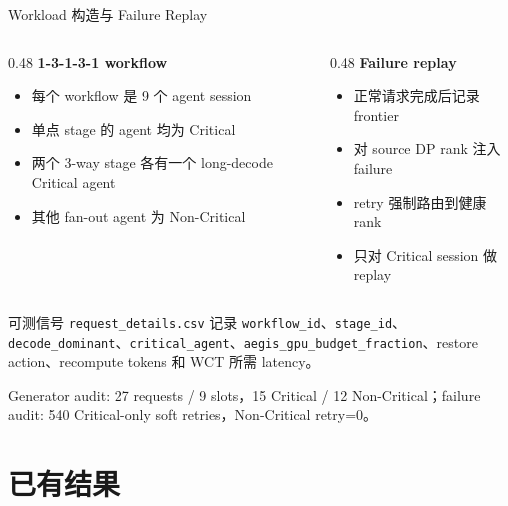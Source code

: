 \documentclass[aspectratio=43]{beamer}
\newcommand{\tightitems}{\setlength{\itemsep}{2pt}\setlength{\parskip}{0pt}}
\begin{document}
\begin{frame}{Workload 构造与 Failure Replay}
  \small
  \begin{columns}[T,onlytextwidth]
    \begin{column}{0.48\textwidth}
      \textbf{1-3-1-3-1 workflow}
      \begin{itemize}
        \tightitems
        \item 每个 workflow 是 9 个 agent session
        \item 单点 stage 的 agent 均为 Critical
        \item 两个 3-way stage 各有一个 long-decode Critical agent
        \item 其他 fan-out agent 为 Non-Critical
      \end{itemize}
    \end{column}
    \begin{column}{0.48\textwidth}
      \textbf{Failure replay}
      \begin{itemize}
        \tightitems
        \item 正常请求完成后记录 frontier
        \item 对 source DP rank 注入 failure
        \item retry 强制路由到健康 rank
        \item 只对 Critical session 做 replay
      \end{itemize}
    \end{column}
  \end{columns}

  \vspace{0.2cm}
  \begin{block}{可测信号}
    \footnotesize
    \texttt{request\_details.csv} 记录 \texttt{workflow\_id}、\texttt{stage\_id}、\texttt{decode\_dominant}、\texttt{critical\_agent}、\texttt{aegis\_gpu\_budget\_fraction}、restore action、recompute tokens 和 WCT 所需 latency。
  \end{block}

  \vspace{0.04cm}
  \scriptsize
  Generator audit: 27 requests / 9 slots，15 Critical / 12 Non-Critical；failure audit: 540 Critical-only soft retries，Non-Critical retry=0。
\end{frame}

\section{已有结果}
\end{document}
